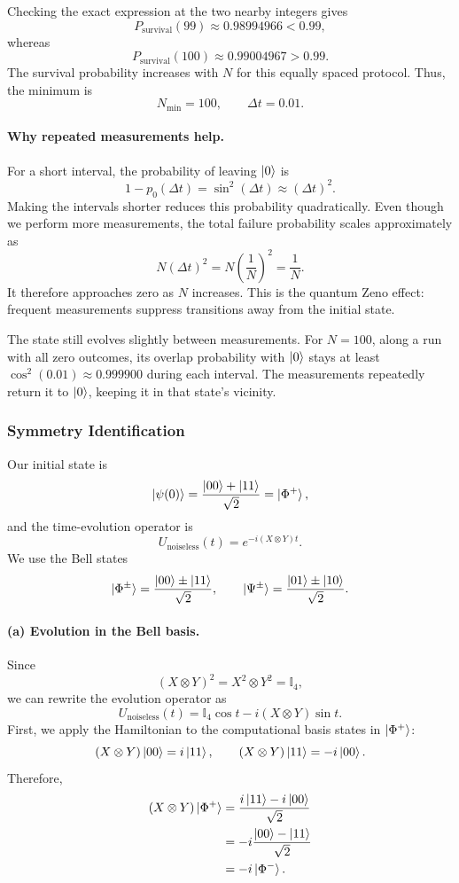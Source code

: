 \documentclass[11pt]{article}
\begin{document}
Checking the exact expression at the two nearby
integers gives
\[
P_{\mathrm{survival}}(99)
\approx 0.98994966<0.99,
\]
whereas
\[
P_{\mathrm{survival}}(100)
\approx 0.99004967>0.99.
\]
The survival probability increases with $N$ for this
equally spaced protocol. Thus, the minimum is
\[
\boxed{N_{\min}=100,\qquad \Delta t=0.01.}
\]

\paragraph{Why repeated measurements help.}
For a short interval, the probability of leaving
$\ket{0}$ is
\[
1-p_0(\Delta t)=\sin^2(\Delta t)
\approx(\Delta t)^2.
\]
Making the intervals shorter reduces this probability
quadratically. Even though we perform more measurements,
the total failure probability scales approximately as
\[
N(\Delta t)^2
=
N\left(\frac{1}{N}\right)^2
=
\frac{1}{N}.
\]
It therefore approaches zero as $N$ increases. This
is the quantum Zeno effect: frequent measurements
suppress transitions away from the initial state.

The state still evolves slightly between measurements.
For $N=100$, along a run with all zero outcomes, its
overlap probability with $\ket{0}$ stays at least
$\cos^2(0.01)\approx0.999900$ during each interval.
The measurements repeatedly return it to $\ket{0}$,
keeping it in that state's vicinity.

\setcounter{subsubsection}{1}
\subsubsection{Symmetry Identification}

Our initial state is
\[
\ket{\psi(0)}
=
\frac{\ket{00}+\ket{11}}{\sqrt{2}}
=
\ket{\Phi^+},
\]
and the time-evolution operator is
\[
U_{\mathrm{noiseless}}(t)=e^{-i(X\otimes Y)t}.
\]
We use the Bell states
\[
\ket{\Phi^\pm}
=
\frac{\ket{00}\pm\ket{11}}{\sqrt{2}},
\qquad
\ket{\Psi^\pm}
=
\frac{\ket{01}\pm\ket{10}}{\sqrt{2}}.
\]

\paragraph{(a) Evolution in the Bell basis.}
Since
\[
(X\otimes Y)^2=X^2\otimes Y^2=\mathbb{I}_4,
\]
we can rewrite the evolution operator as
\[
U_{\mathrm{noiseless}}(t)
=
\mathbb{I}_4\cos t-i(X\otimes Y)\sin t.
\]
First, we apply the Hamiltonian to the computational
basis states in $\ket{\Phi^+}$:
\[
(X\otimes Y)\ket{00}=i\ket{11},
\qquad
(X\otimes Y)\ket{11}=-i\ket{00}.
\]
Therefore,
\[
\begin{aligned}
(X\otimes Y)\ket{\Phi^+}
&=
\frac{i\ket{11}-i\ket{00}}{\sqrt{2}}\\
&=
-i\frac{\ket{00}-\ket{11}}{\sqrt{2}}\\
&=-i\ket{\Phi^-}.
\end{aligned}
\]
\end{document}

